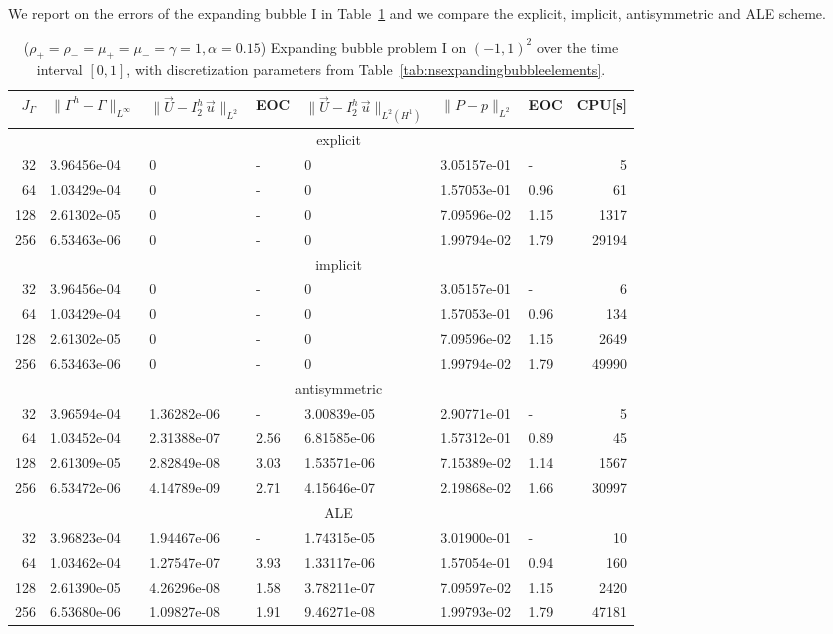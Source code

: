 \documentclass[a4paper,12pt,onecolumn]{article}
\newcommand{\errorXx}{\|\Gamma^h - \Gamma\|_{L^\infty}}
\newcommand{\LerrorUu}[1]{\|\vec U - I^h_{#1}\,\vec u\|_{L^2}}
\newcommand{\HerrorUu}[1]{\|\vec U - I^h_{#1}\,\vec u\|_{L^2(H^1)}}
\newcommand{\LerrorPp}{\|P - p\|_{L^2}}
\begin{document}
We report on the errors of the expanding bubble I in
Table~\ref{tab:nsexpandingbubbleIp2p1p0} and we compare the explicit, implicit,
antisymmetric and ALE scheme.
\begin{table}
\center
\hspace*{-3.25cm}
\begin{tabular}{rllllllr}
\hline
$J_\Gamma$ & $\errorXx$ & $\LerrorUu2$ & EOC & $\HerrorUu2$ & $\LerrorPp$ & EOC
& CPU[s] \\
\hline
& \multicolumn{7}{c}{explicit} \\
\hline
 32 & 3.96456e-04 & 0 & - & 0 & 3.05157e-01 &    - &     5 \\
 64 & 1.03429e-04 & 0 & - & 0 & 1.57053e-01 & 0.96 &    61 \\
128 & 2.61302e-05 & 0 & - & 0 & 7.09596e-02 & 1.15 &  1317 \\
256 & 6.53463e-06 & 0 & - & 0 & 1.99794e-02 & 1.79 & 29194 \\
\hline
& \multicolumn{7}{c}{implicit} \\
\hline
 32 & 3.96456e-04 & 0 & - & 0 & 3.05157e-01 &    - &     6 \\
 64 & 1.03429e-04 & 0 & - & 0 & 1.57053e-01 & 0.96 &   134 \\
128 & 2.61302e-05 & 0 & - & 0 & 7.09596e-02 & 1.15 &  2649 \\
256 & 6.53463e-06 & 0 & - & 0 & 1.99794e-02 & 1.79 & 49990 \\
\hline
& \multicolumn{7}{c}{antisymmetric} \\
\hline
 32 & 3.96594e-04 & 1.36282e-06 &    - & 3.00839e-05 & 2.90771e-01 &    - &
5 \\
 64 & 1.03452e-04 & 2.31388e-07 & 2.56 & 6.81585e-06 & 1.57312e-01 & 0.89 &
45 \\
128 & 2.61309e-05 & 2.82849e-08 & 3.03 & 1.53571e-06 & 7.15389e-02 & 1.14 &
1567 \\
256 & 6.53472e-06 & 4.14789e-09 & 2.71 & 4.15646e-07 & 2.19868e-02 & 1.66 &
30997 \\
\hline
& \multicolumn{7}{c}{ALE} \\
\hline
 32 & 3.96823e-04 & 1.94467e-06 &    - & 1.74315e-05 & 3.01900e-01 &    - &
10 \\
 64 & 1.03462e-04 & 1.27547e-07 & 3.93 & 1.33117e-06 & 1.57054e-01 & 0.94 &
160 \\
128 & 2.61390e-05 & 4.26296e-08 & 1.58 & 3.78211e-07 & 7.09597e-02 & 1.15 &
2420 \\
256 & 6.53680e-06 & 1.09827e-08 & 1.91 & 9.46271e-08 & 1.99793e-02 & 1.79 &
47181 \\
\hline
\end{tabular}
\hspace*{-3.25cm}
\caption[Navier--Stokes expanding bubble I errors]
{($\rho_+ = \rho_- = \mu_+ = \mu_- = \gamma = 1,\alpha=0.15$)
Expanding bubble problem I on $(-1,1)^2$ over the time interval $[0,1]$, with
discretization parameters from Table~\ref{tab:nsexpandingbubbleelements}.}
\label{tab:nsexpandingbubbleIp2p1p0}
\end{table}
\end{document}

